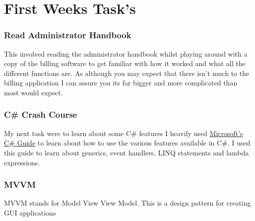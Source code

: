 \section{First Weeks Task's}{
	\subsubsection*{Read Administrator Handbook}{
		This involved reading the administrator handbook whilst playing around with a copy of the billing software to get familiar with how it worked and what all the different functions are. As although you may expect that there isn't much to the billing application I can assure you its far bigger and more complicated than most would expect.
	}
	\subsubsection*{C\# Crash Course}{
		My next task were to learn about some C\# features I heavily used \href{https://docs.microsoft.com/en-gb/dotnet/csharp/programming-guide/}{Microsoft's C\# Guide}\cite{CSProgrammingGuide2017} to learn about how to use the various features available in C\#. I used this guide to learn about generics, event handlers, LINQ statements and lambda expressions.
	}
	\subsubsection*{MVVM}{
		MVVM stands for Model View View Model. This is a design pattern for creating GUI applications 
	}
}